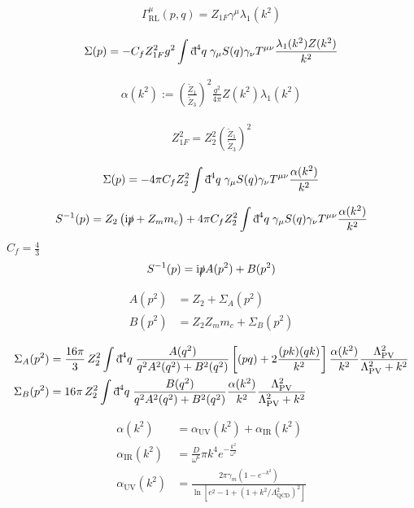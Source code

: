 \documentclass[oneside, openany]{book}
\numberwithin{equation}{chapter}
\numberwithin{figure}{chapter}
\newcommand{\ii}{\mathrm{i}}
\newcommand{\dbar}{\mathord{\mathrm{d}\mkern-8mu\raisebox{0.55em}{\rule{0.38em}{0.05em}}\mkern0.1mu}}
\newcommand{\p}[0]{\slashed{p}}
\newcommand{\g}[0]{\gamma}
\begin{document}
\begin{align}
	\Gamma^\mu_\text{RL}(p,q) = Z_{1F}\g^\mu\lambda_1(k^2)
\end{align}

\begin{align}
	\Sigma(p) = -C_f Z_{1F}^2 g^2 \int \dbar^4 q\; \g_\mu S(q)\g_\nu T^{\mu\nu} \frac{\lambda_1(k^2)Z(k^2)}{k^2}
\end{align}

\begin{align}
	\alpha(k^2) := \left(\frac{\tilde Z_1}{\tilde Z_3}\right)^2 \frac{g^2}{4\pi} Z(k^2)\lambda_1(k^2)
\end{align}

\begin{align}
	Z_{1F}^2 = Z_2^2 \left(\frac{\tilde Z_1}{\tilde Z_3}\right)^2
\end{align}

\begin{align}
	\Sigma(p) = -4\pi C_f Z_2^2\int \dbar^4 q\; \g_\mu S(q)\g_\nu T^{\mu\nu} \frac{\alpha(k^2)}{k^2}
\end{align}

\begin{align}
	S^{-1}(p) = Z_2 \left( \ii\p + Z_m m_c \right) + 4\pi C_f Z_2^2 \int \dbar^4 q\; \g_\mu S(q)\g_\nu T^{\mu\nu} \frac{\alpha(k^2)}{k^2}
\end{align}
$C_f = \frac{4}{3}$
\begin{align}
	S^{-1}(p) = \ii \p A(p^2) + B(p^2)
\end{align}

\begin{align}
	A(p^2) &= Z_2 + \Sigma_A(p^2) \\
	B(p^2) &= Z_2 Z_m m_c + \Sigma_B(p^2)
\end{align}

\begin{align}
	\Sigma_A(p^2) &= \frac{16\pi}{3}\, Z_2^2 \int \dbar^4 q \; \frac{A(q^2)}{q^2 A^2(q^2) + B^2(q^2)} \left[ (pq) + 2 \frac{(pk)(qk)}{k^2} \right] \frac{\alpha(k^2)}{k^2} \frac{\Lambda_\textrm{PV}^2}{\Lambda_\textrm{PV}^2 + k^2} \\
	\Sigma_B(p^2) &= 16\pi \, Z_2^2 \int \dbar^4 q \; \frac{B(q^2)}{q^2 A^2(q^2) + B^2(q^2)} \frac{\alpha(k^2)}{k^2} \frac{\Lambda_\textrm{PV}^2}{\Lambda_\textrm{PV}^2 + k^2}
\end{align}

\begin{align}
	\alpha(k^2) &= \alpha_\textrm{UV}(k^2) + \alpha_\textrm{IR}(k^2) \\
	\alpha_\textrm{IR}(k^2) &= \frac{D}{\omega^6} \pi k^4 e^{-\tfrac{k^2}{\omega^2}} \\
	\alpha_\textrm{UV}(k^2) &= \frac{2\pi \gamma_m \left(1-e^{-k^2}\right)}{\ln\left[e^2-1+\left(1+ k^2/\Lambda_\mathrm{QCD}^2\right)^2\right]}
\end{align}
\end{document}
